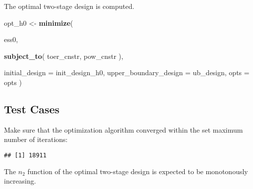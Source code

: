 \documentclass[]{book}
\newenvironment{Shaded}{\begin{snugshade}}{\end{snugshade}}
\newcommand{\DataTypeTok}[1]{\textcolor[rgb]{0.13,0.29,0.53}{#1}}
\newcommand{\DecValTok}[1]{\textcolor[rgb]{0.00,0.00,0.81}{#1}}
\newcommand{\KeywordTok}[1]{\textcolor[rgb]{0.13,0.29,0.53}{\textbf{#1}}}
\newcommand{\NormalTok}[1]{#1}
\newcommand{\OperatorTok}[1]{\textcolor[rgb]{0.81,0.36,0.00}{\textbf{#1}}}
\newcommand{\StringTok}[1]{\textcolor[rgb]{0.31,0.60,0.02}{#1}}
\begin{document}
The optimal two-stage design is computed.

\begin{Shaded}
\begin{Highlighting}[]
\NormalTok{opt_h0 <-}\StringTok{ }\KeywordTok{minimize}\NormalTok{(}
  
\NormalTok{    ess0,}
    
    \KeywordTok{subject_to}\NormalTok{(}
\NormalTok{        toer_cnstr,}
\NormalTok{        pow_cnstr}
\NormalTok{    ),}
    
    \DataTypeTok{initial_design        =}\NormalTok{ init_design_h0,}
    \DataTypeTok{upper_boundary_design =}\NormalTok{ ub_design,}
    \DataTypeTok{opts =}\NormalTok{ opts )}
\end{Highlighting}
\end{Shaded}

\hypertarget{test-cases-1}{%
\subsection{Test Cases}\label{test-cases-1}}

Make sure that the optimization algorithm converged within the set
maximum number of iterations:

\begin{Shaded}
\end{Shaded}

\begin{verbatim}
## [1] 18911
\end{verbatim}

The \(n_2\) function of the optimal two-stage design is expected to be
monotonously increasing.

\begin{Shaded}
\end{Shaded}
\end{document}
